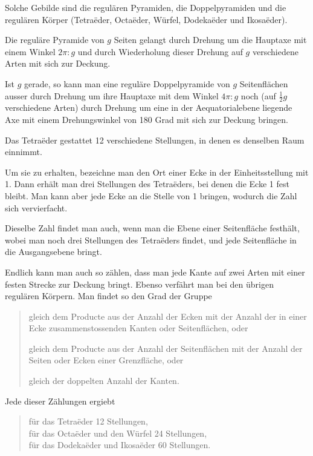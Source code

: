 
Solche Gebilde sind die regulären Pyramiden, die Doppelpyramiden
und die regulären Körper (Tetra\"eder, Octa\"eder, Würfel,
Dodeka\"eder und Ikosa\"eder).

Die reguläre Pyramide von $g$ Seiten gelangt durch Drehung um die
Hauptaxe mit einem Winkel $2\pi:g$ und durch Wiederholung dieser
Drehung auf $g$ verschiedene Arten mit sich zur Deckung.

Ist $g$ gerade, so kann man eine reguläre Doppelpyramide von $g$
Seitenflächen ausser durch Drehung um ihre Hauptaxe mit dem Winkel
$4\pi:g$ noch (auf $\tfrac{1}{2}g$ verschiedene Arten) durch Drehung
um eine in der Aequatorialebene liegende Axe mit einem
Drehungswinkel von 180 Grad mit sich zur Deckung bringen.

Das Tetra\"eder gestattet 12 verschiedene Stellungen, in denen es
denselben Raum einnimmt.

Um sie zu erhalten, bezeichne man den Ort einer Ecke in der
Einheitsstellung mit 1. Dann erhält man drei Stellungen des
Tetra\"eders, bei denen die Ecke 1 fest bleibt. Man kann aber jede
Ecke an die Stelle von 1 bringen, wodurch die Zahl sich
vervierfacht.

Dieselbe Zahl findet man auch, wenn man die Ebene einer
Seitenfläche festhält, wobei man noch drei Stellungen des
Tetra\"eders findet, und jede Seitenfläche in die Ausgangsebene
bringt.

Endlich kann man auch so zählen, dass man jede Kante auf zwei
Arten mit einer festen Strecke zur Deckung bringt. Ebenso
verfährt man bei den übrigen regulären Körpern. Man findet so den
Grad der Gruppe

\begin{quote}
gleich dem Producte aus der Anzahl der Ecken mit der Anzahl der in
einer Ecke zusammenstossenden Kanten oder Seitenflächen, oder

gleich dem Producte aus der Anzahl der Seitenflächen mit der
Anzahl der Seiten oder Ecken einer Grenzfläche, oder

gleich der doppelten Anzahl der Kanten.
\end{quote}

Jede dieser Zählungen ergiebt

\begin{quote}
für das Tetra\"eder 12 Stellungen,\\
für das Octa\"eder und den Würfel 24 Stellungen,\\
für das Dodeka\"eder und Ikosa\"eder 60 Stellungen.
\end{quote}
